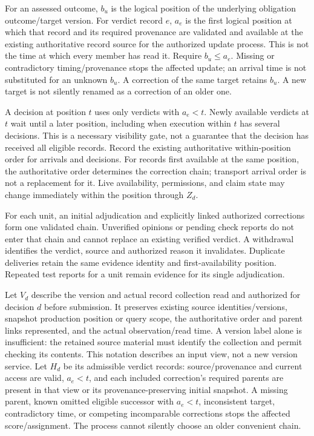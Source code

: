 \documentclass[
  english,
  11pt,
]{article}
\begin{document}
For an assessed outcome, \(b_u\) is the logical position of the
underlying obligation outcome/target version. For verdict record \(e\),
\(a_e\) is the first logical position at which that record and its
required provenance are validated and available at the existing
authoritative record source for the authorized update process. This is
not the time at which every member has read it. Require \(b_u\leq a_e\).
Missing or contradictory timing/provenance stops the affected update; an
arrival time is not substituted for an unknown \(b_u\). A correction of
the same target retains \(b_u\). A new target is not silently renamed as
a correction of an older one.

A decision at position \(t\) uses only verdicts with \(a_e<t\). Newly
available verdicts at \(t\) wait until a later position, including when
execution within \(t\) has several decisions. This is a necessary
visibility gate, not a guarantee that the decision has received all
eligible records. Record the existing authoritative within-position
order for arrivals and decisions. For records first available at the
same position, the authoritative order determines the correction chain;
transport arrival order is not a replacement for it. Live availability,
permissions, and claim state may change immediately within the position
through \(Z_d\).

For each unit, an initial adjudication and explicitly linked authorized
corrections form one validated chain. Unverified opinions or pending
check reports do not enter that chain and cannot replace an existing
verified verdict. A withdrawal identifies the verdict, source and
authorized reason it invalidates. Duplicate deliveries retain the same
evidence identity and first-availability position. Repeated test reports
for a unit remain evidence for its single adjudication.

Let \(V_d\) describe the version and actual record collection read and
authorized for decision \(d\) before submission. It preserves existing
source identities/versions, snapshot production position or query scope,
the authoritative order and parent links represented, and the actual
observation/read time. A version label alone is insufficient: the
retained source material must identify the collection and permit
checking its contents. This notation describes an input view, not a new
version service. Let \(H_d\) be its admissible verdict records:
source/provenance and current access are valid, \(a_e<t\), and each
included correction's required parents are present in that view or its
provenance-preserving initial snapshot. A missing parent, known omitted
eligible successor with \(a_e<t\), inconsistent target, contradictory
time, or competing incomparable corrections stops the affected
score/assignment. The process cannot silently choose an older convenient
chain.
\end{document}
